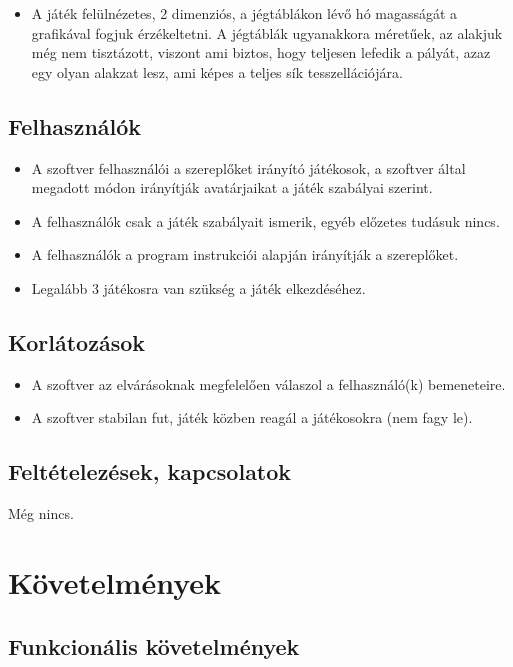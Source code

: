 \begin{itemize}
\item A játék felülnézetes, 2 dimenziós, a jégtáblákon lévő hó magasságát a grafikával fogjuk érzékeltetni. A jégtáblák ugyanakkora méretűek, az alakjuk még nem tisztázott, viszont ami biztos, hogy teljesen lefedik a pályát, azaz egy olyan alakzat lesz, ami képes a teljes sík tesszellációjára.
\end{itemize}

\subsection{Felhasználók}
\begin{itemize}
\item A szoftver felhasználói a szereplőket irányító játékosok, a szoftver által megadott módon irányítják avatárjaikat a játék szabályai szerint.

\item A felhasználók csak a játék szabályait ismerik, egyéb előzetes tudásuk nincs.

\item A felhasználók a program instrukciói alapján irányítják a szereplőket.

\item Legalább 3 játékosra van szükség a játék elkezdéséhez.
\end{itemize}

\subsection{Korlátozások}
\begin{itemize}
	\item A szoftver az elvárásoknak megfelelően válaszol a felhasználó(k) bemeneteire.
	\item A szoftver stabilan fut, játék közben reagál a játékosokra (nem fagy le).
\end{itemize}

\subsection{Feltételezések, kapcsolatok}
Még nincs.

\section{Követelmények}
\subsection{Funkcionális követelmények}


